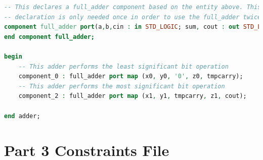 \documentclass[11pt]{article}
\begin{document}
\begin{appendices}
\begin{lstlisting}[language=VHDL]
-- This declares a full_adder component based on the entity above. This 
-- declaration is only needed once in order to use the full_adder twice.
component full_adder port(a,b,cin : in STD_LOGIC; sum, cout : out STD_LOGIC);
end component full_adder;

begin
    -- This adder performs the least significant bit operation
    component_0 : full_adder port map (x0, y0, '0', z0, tmpcarry);
    -- This adder performs the most significant bit operation
    component_2 : full_adder port map (x1, y1, tmpcarry, z1, cout);

end adder;
\end{lstlisting}

\section{Part 3 Constraints File}

\end{appendices}
\end{document}
